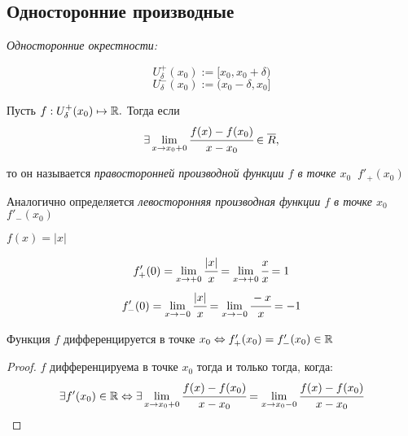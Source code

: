 \subsection{Односторонние производные}
\begin{definition}
    \textit{Односторонние окрестности:}

    $$
    U^{+}_{\delta} (x_{0}) := [x_{0}, x_{0} + \delta) 
    $$
    $$
    U^{-}_{\delta} (x_{0}) := (x_{0} - \delta, x_{0}]
    $$
\end{definition}

\begin{definition}
    Пусть $f:U^{+}_{\delta} (x_{0}) \mapsto \mathbb{R}.$ Тогда если
    $$\exists \lim\limits_{x \to x_{0} +0} \cfrac{f(x) - f(x_{0})}{x-x_{0}} \in \overline{R},$$

    то он называется \textit{правосторонней производной функции $f$ в точке $x_{0} \ $} $f'_{+}(x_{0})$

    Аналогично определяется \textit{левосторонняя производная функции $f$ в точке $x_{0} \ $} $f'_{-}(x_{0})$
\end{definition}
\begin{example}
    $ f(x) = |x| $

    $$
    f'_{+}(0) = \lim\limits_{x \to +0} \cfrac{|x|}{x} = \lim\limits_{x\to +0} \cfrac{x}{x} = 1
    $$
    $$
    f'_{-}(0) = \lim\limits_{x \to -0} \cfrac{|x|}{x} = \lim\limits_{x\to -0} \cfrac{-x}{x} = -1
    $$
\end{example}

\begin{theorem}
    Функция $f$ дифференцируется в точке $x_{0} \Leftrightarrow f'_{+}(x_{0}) = f'_{-}(x_{0}) \in \mathbb{R}$ 
\end{theorem}
\begin{proof}
    $f$ дифференцируема в точке $x_{0}$ тогда и только тогда, когда:
    $$
    \exists f'(x_{0}) \in \mathbb{R} \Leftrightarrow \exists \lim\limits_{x \to x_{0} +0}  \cfrac{f(x) - f(x_{0})}{x-x_{0}} = \lim\limits_{x \to x_{0} -0} \cfrac{f(x) - f(x_{0})}{x-x_{0}}$$
\end{proof}

